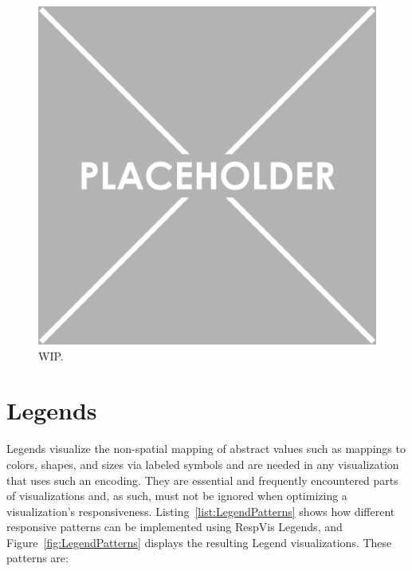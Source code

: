 \begin{samepage}
%
    WIP
  },
]{listings/axis-patterns.html}
\end{samepage}

\begin{figure}[tp]
\centering
\includegraphics[keepaspectratio,width=\linewidth,height=\fullh]{images/placeholder.png}
\caption[Results of Axis-Related Responsive Patterns]{
  WIP.
}
\label{fig:AxisPatterns}
\end{figure}

\section{Legends}
\label{sec:LegendsUsage}

Legends visualize the non-spatial mapping of abstract values such as mappings to colors, shapes, and sizes via labeled symbols and are needed in any visualization that uses such an encoding.
They are essential and frequently encountered parts of visualizations and, as such, must not be ignored when optimizing a visualization's responsiveness. 
Listing~\ref{list:LegendPatterns} shows how different responsive patterns can be implemented using RespVis Legends, and Figure~\ref{fig:LegendPatterns} displays the resulting Legend visualizations.
These patterns are:

